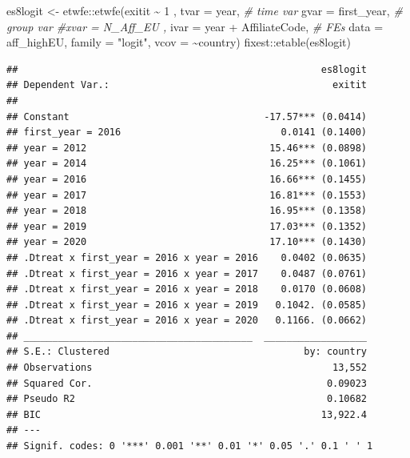\documentclass[
]{article}
\newenvironment{Shaded}{\begin{snugshade}}{\end{snugshade}}
\newcommand{\AttributeTok}[1]{\textcolor[rgb]{0.77,0.63,0.00}{#1}}
\newcommand{\CommentTok}[1]{\textcolor[rgb]{0.56,0.35,0.01}{\textit{#1}}}
\newcommand{\DecValTok}[1]{\textcolor[rgb]{0.00,0.00,0.81}{#1}}
\newcommand{\FunctionTok}[1]{\textcolor[rgb]{0.00,0.00,0.00}{#1}}
\newcommand{\NormalTok}[1]{#1}
\newcommand{\OtherTok}[1]{\textcolor[rgb]{0.56,0.35,0.01}{#1}}
\newcommand{\SpecialCharTok}[1]{\textcolor[rgb]{0.00,0.00,0.00}{#1}}
\newcommand{\StringTok}[1]{\textcolor[rgb]{0.31,0.60,0.02}{#1}}
\begin{document}
\begin{Shaded}
\begin{Highlighting}[]
\NormalTok{es8logit }\OtherTok{\textless{}{-}}\NormalTok{ etwfe}\SpecialCharTok{::}\FunctionTok{etwfe}\NormalTok{(exitit }\SpecialCharTok{\textasciitilde{}}  \DecValTok{1}\NormalTok{  ,}
               \AttributeTok{tvar =}\NormalTok{ year, }\CommentTok{\# time var}
               \AttributeTok{gvar =}\NormalTok{ first\_year, }\CommentTok{\# group var}
               \CommentTok{\#xvar = N\_Aff\_EU  ,}
               \AttributeTok{ivar =}\NormalTok{  year }\SpecialCharTok{+}\NormalTok{ AffiliateCode, }\CommentTok{\# FEs}
               \AttributeTok{data =}\NormalTok{ aff\_highEU,}
               \AttributeTok{family =} \StringTok{"logit"}\NormalTok{,}
               \AttributeTok{vcov =} \SpecialCharTok{\textasciitilde{}}\NormalTok{country)}
\NormalTok{fixest}\SpecialCharTok{::}\FunctionTok{etable}\NormalTok{(es8logit)}
\end{Highlighting}
\end{Shaded}

\begin{verbatim}
##                                                     es8logit
## Dependent Var.:                                       exitit
##                                                             
## Constant                                  -17.57*** (0.0414)
## first_year = 2016                            0.0141 (0.1400)
## year = 2012                                15.46*** (0.0898)
## year = 2014                                16.25*** (0.1061)
## year = 2016                                16.66*** (0.1455)
## year = 2017                                16.81*** (0.1553)
## year = 2018                                16.95*** (0.1358)
## year = 2019                                17.03*** (0.1352)
## year = 2020                                17.10*** (0.1430)
## .Dtreat x first_year = 2016 x year = 2016    0.0402 (0.0635)
## .Dtreat x first_year = 2016 x year = 2017    0.0487 (0.0761)
## .Dtreat x first_year = 2016 x year = 2018    0.0170 (0.0608)
## .Dtreat x first_year = 2016 x year = 2019   0.1042. (0.0585)
## .Dtreat x first_year = 2016 x year = 2020   0.1166. (0.0662)
## ________________________________________  __________________
## S.E.: Clustered                                  by: country
## Observations                                          13,552
## Squared Cor.                                         0.09023
## Pseudo R2                                            0.10682
## BIC                                                 13,922.4
## ---
## Signif. codes: 0 '***' 0.001 '**' 0.01 '*' 0.05 '.' 0.1 ' ' 1
\end{verbatim}
\end{document}
